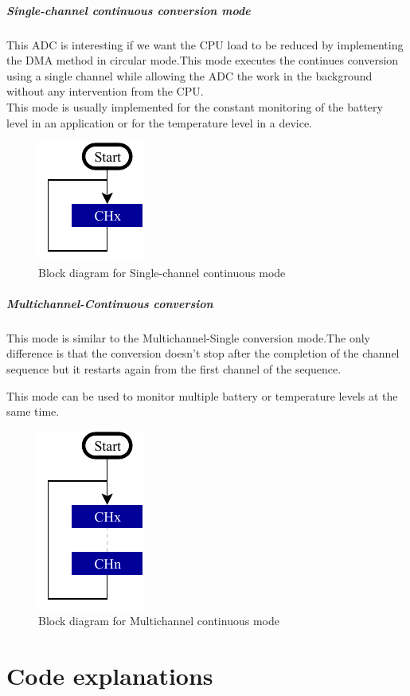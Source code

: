\documentclass[a4paper, 11pt, openany, oneside]{book}
\begin{document}
\newpage

\paragraph{Single-channel continuous conversion mode}
This ADC is interesting if we want the CPU load to be reduced by implementing the DMA  method in circular mode.This mode executes the  continues conversion using a single channel while allowing the ADC the work in the background without any intervention from the CPU.\\

This mode is usually implemented for the constant monitoring of the battery level in an application or for the temperature level in a device. 


\begin{figure}[b] %
\centering
\includegraphics[width= 0.2\linewidth]{HS_STM32-single-channel_single_continuous.pdf}
\caption{Block diagram for Single-channel continuous mode}
\end{figure}

\newpage

\paragraph{Multichannel-Continuous conversion}

This mode is similar to the Multichannel-Single conversion mode.The only difference is that the conversion doesn't stop after the completion of the channel sequence but it restarts again from the first channel of the sequence.\newline

This mode can be used to monitor multiple battery or temperature levels at the same time.


\begin{figure}[b]
\centering
\includegraphics[width= 0.2\linewidth]{HS_STM32-single-channel_multi-single-continuous.pdf}
\caption{Block diagram for Multichannel continuous mode}
\end{figure}

\newpage
\chapter{Code explanations}

\renewcommand\listoflistingscaption{List of source codes}
\listoflistings
\end{document}
